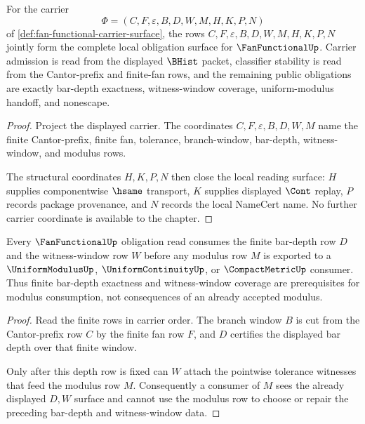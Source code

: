 \begin{theorem}
\label{thm:fanfunctional-obligation-closure-scope}
For the carrier
$$
\Phi=(C,F,\varepsilon,B,D,W,M,H,K,P,N)
$$
of \autoref{def:fan-functional-carrier-surface}, the rows
$C,F,\varepsilon,B,D,W,M,H,K,P,N$ jointly form the complete local obligation
surface for $\FanFunctionalUp$. Carrier admission is read from the displayed
$\BHist$ packet, classifier stability is read from the Cantor-prefix and
finite-fan rows, and the remaining public obligations are exactly bar-depth
exactness, witness-window coverage, uniform-modulus handoff, and nonescape.
\end{theorem}
\begin{proof}
Project the displayed carrier. The coordinates $C,F,\varepsilon,B,D,W,M$
name the finite Cantor-prefix, finite fan, tolerance, branch-window,
bar-depth, witness-window, and modulus rows.

The structural coordinates $H,K,P,N$ then close the local reading surface:
$H$ supplies componentwise $\hsame$ transport, $K$ supplies displayed $\Cont$
replay, $P$ records package provenance, and $N$ records the local NameCert
name. No further carrier coordinate is available to the chapter.
\end{proof}

\begin{theorem}
\label{thm:fanfunctional-obligation-bar-depth-coverage}
Every $\FanFunctionalUp$ obligation read consumes the finite bar-depth row $D$
and the witness-window row $W$ before any modulus row $M$ is exported to a
$\UniformModulusUp$, $\UniformContinuityUp$, or $\CompactMetricUp$ consumer.
Thus finite bar-depth exactness and witness-window coverage are prerequisites
for modulus consumption, not consequences of an already accepted modulus.
\end{theorem}
\begin{proof}
Read the finite rows in carrier order. The branch window $B$ is cut from the
Cantor-prefix row $C$ by the finite fan row $F$, and $D$ certifies the displayed
bar depth over that finite window.

Only after this depth row is fixed can $W$ attach the pointwise tolerance
witnesses that feed the modulus row $M$. Consequently a consumer of $M$ sees
the already displayed $D,W$ surface and cannot use the modulus row to choose or
repair the preceding bar-depth and witness-window data.
\end{proof}

